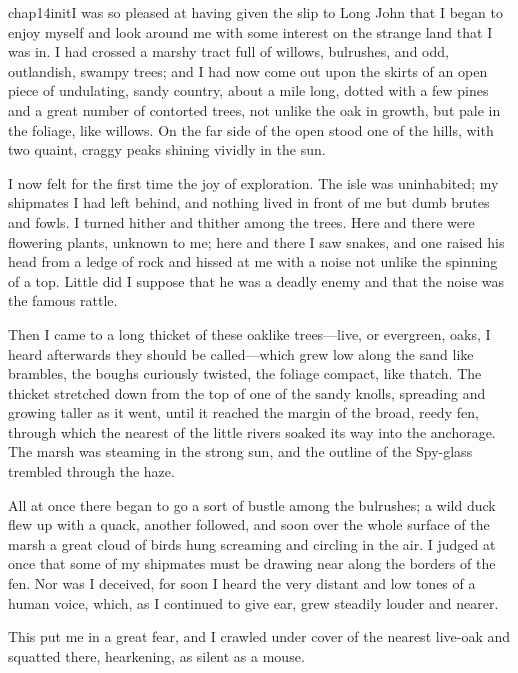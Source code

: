 
\lettrine{chap14initI}{} was so pleased at having given the slip to Long John that I began to enjoy myself and look around me with some interest on the strange land that I was in. I had crossed a marshy tract full of willows, bulrushes, and odd, outlandish, swampy trees; and I had now come out upon the skirts of an open piece of undulating, sandy country, about a mile long, dotted with a few pines and a great number of contorted trees, not unlike the oak in growth, but pale in the foliage, like willows. On the far side of the open stood one of the hills, with two quaint, craggy peaks shining vividly in the sun.

I now felt for the first time the joy of exploration. The isle was uninhabited; my shipmates I had left behind, and nothing lived in front of me but dumb brutes and fowls. I turned hither and thither among the trees. Here and there were flowering plants, unknown to me; here and there I saw snakes, and one raised his head from a ledge of rock and hissed at me with a noise not unlike the spinning of a top. Little did I suppose that he was a deadly enemy and that the noise was the famous rattle.

Then I came to a long thicket of these oaklike trees—live, or evergreen, oaks, I heard afterwards they should be called—which grew low along the sand like brambles, the boughs curiously twisted, the foliage compact, like thatch. The thicket stretched down from the top of one of the sandy knolls, spreading and growing taller as it went, until it reached the margin of the broad, reedy fen, through which the nearest of the little rivers soaked its way into the anchorage. The marsh was steaming in the strong sun, and the outline of the Spy-glass trembled through the haze.

All at once there began to go a sort of bustle among the bulrushes; a wild duck flew up with a quack, another followed, and soon over the whole surface of the marsh a great cloud of birds hung screaming and circling in the air. I judged at once that some of my shipmates must be drawing near along the borders of the fen. Nor was I deceived, for soon I heard the very distant and low tones of a human voice, which, as I continued to give ear, grew steadily louder and nearer.

This put me in a great fear, and I crawled under cover of the nearest live-oak and squatted there, hearkening, as silent as a mouse.

